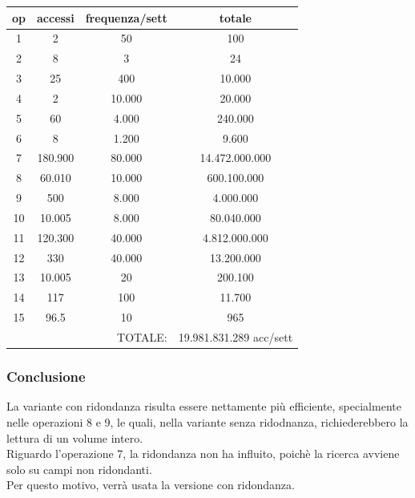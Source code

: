\documentclass[a4paper,12pt]{report}
\begin{document}
\begin{center}
\setlength{\tabcolsep}{18pt} %
\renewcommand{\arraystretch}{1.5} %
\begin{tabular}{c|c|c|c}
op & accessi & frequenza/sett & totale \\
\hline
\hline
1 & 2 & 50 & 100 \\ \hline
2 & 8 & 3 & 24 \\ \hline
3 & 25 & 400 & 10.000 \\ \hline
4 & 2 & 10.000 & 20.000 \\ \hline
5 & 60 & 4.000 & 240.000 \\ \hline
6 & 8 & 1.200 & 9.600 \\ \hline
7 & 180.900 & 80.000 & 14.472.000.000 \\ \hline
8 & 60.010 & 10.000 & 600.100.000 \\ \hline
9 & 500 & 8.000 & 4.000.000 \\ \hline
10 & 10.005 & 8.000 & 80.040.000 \\ \hline
11 & 120.300 & 40.000 & 4.812.000.000 \\ \hline
12 & 330 & 40.000 & 13.200.000 \\ \hline
13 & 10.005 & 20 & 200.100 \\ \hline 
14 & 117 & 100 & 11.700 \\ \hline
15 & 96.5 & 10 & 965 \\ \hline \hline
\multicolumn{3}{r|}{TOTALE:} & 19.981.831.289 acc/sett \\
\end{tabular}
\end{center}

\newpage
\subsubsection{Conclusione}
\normalsize La variante con ridondanza risulta essere nettamente più efficiente, specialmente nelle operazioni 8 e 9, le quali, nella variante senza ridodnanza, richiederebbero la lettura di un volume intero.
\\
Riguardo l'operazione 7, la ridondanza non ha influito, poichè la ricerca avviene solo su campi non ridondanti.
\\
Per questo motivo, verrà usata la versione con ridondanza.
\end{document}
